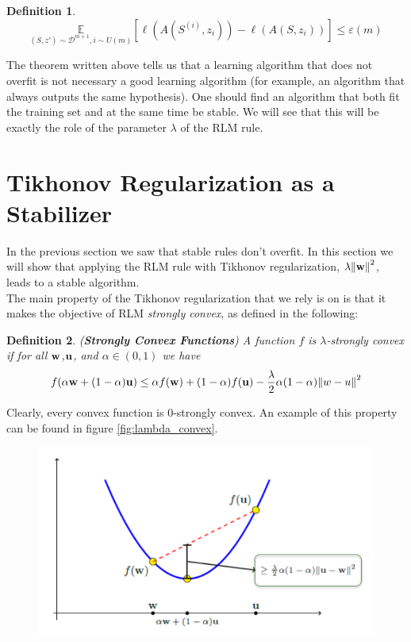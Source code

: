 \documentclass[12pt]{report}
\theoremstyle{plain}
\newtheorem{definition}{Definition}[chapter]
\newcommand\mcl[1]{\mathcal{#1}}
\begin{document}
\begin{flushleft}
\begin{definition}
	\[ \underset{(S,z')\sim\mcl{D}^{m+1},i\sim U(m)}{\mathds{E}}\left[\ell(A(S^{(i)},z_i))-\ell(A(S,z_i))\right]\leq\varepsilon(m) \]
	\label{def:OAROS}	
\end{definition}
The theorem written above tells us that a learning algorithm that does not overfit is not necessary a good learning algorithm (for example, an algorithm that always outputs the same hypothesis). One should find an algorithm that both fit the training set and at the same time be stable. We will see that this will be exactly the role of the parameter $\lambda$ of the RLM rule. 

\section{Tikhonov Regularization as a Stabilizer}
In the previous section we saw that stable rules don't overfit. In this section we will show that applying the RLM rule with Tikhonov regularization, $\lambda\norm{\vb{w}}^2$, leads to a stable algorithm.\\
The main property of the Tikhonov regularization that we rely is on is that it makes the objective of RLM \textit{strongly convex}, as defined in the following:
\begin{definition} (\textbf{Strongly Convex Functions})
	A function $f$ is $\lambda$-strongly convex if for all $\vb{w}$,$\vb{u}$, and $\alpha\in(0,1)$ we have
	\[ f(\alpha\vb{w}+(1-\alpha)\vb{u})\leq\alpha f(\vb{w})+(1-\alpha)f(\vb{u})-\frac{\lambda}{2}\alpha(1-\alpha)\norm{w-u}^2 \]	
	\label{def:strongly_convex}
\end{definition}
Clearly, every convex function is 0-strongly convex. An example of this property can be found in figure \ref{fig:lambda_convex}.
\begin{figure}[!h]
	\centering
	\includegraphics[scale=0.5]{images/lambda_convex.pdf}

\end{figure}
\end{flushleft}
\end{document}
